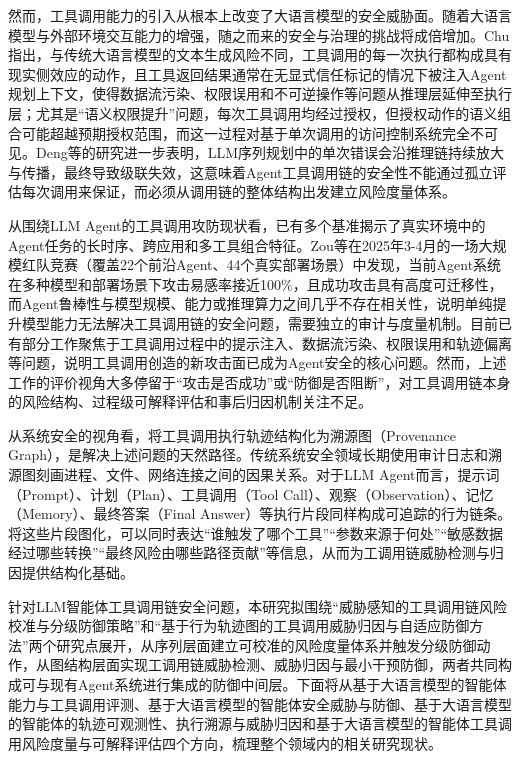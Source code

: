 然而，工具调用能力的引入从根本上改变了大语言模型的安全威胁面。随着大语言模型与外部环境交互能力的增强，随之而来的安全与治理的挑战将成倍增加\cite{weidinger2022taxonomy}。Chu\cite{chu2026systematic}指出，与传统大语言模型的文本生成风险不同，工具调用的每一次执行都构成具有现实侧效应的动作，且工具返回结果通常在无显式信任标记的情况下被注入Agent规划上下文，使得数据流污染、权限误用和不可逆操作等问题从推理层延伸至执行层；尤其是“语义权限提升”问题，每次工具调用均经过授权，但授权动作的语义组合可能超越预期授权范围，而这一过程对基于单次调用的访问控制系统完全不可见。Deng等\cite{deng2025agentsunderthreat}的研究进一步表明，LLM序列规划中的单次错误会沿推理链持续放大与传播，最终导致级联失效，这意味着Agent工具调用链的安全性不能通过孤立评估每次调用来保证，而必须从调用链的整体结构出发建立风险度量体系。

从围绕LLM Agent的工具调用攻防现状看，已有多个基准揭示了真实环境中的Agent任务的长时序、跨应用和多工具组合特征\cite{zhou2023webarena,deng2023mind2web,xie2024osworld,bonatti2025windows}。Zou等\cite{zou2025security}在2025年3-4月的一场大规模红队竞赛（覆盖22个前沿Agent、44个真实部署场景）中发现，当前Agent系统在多种模型和部署场景下攻击易感率接近100\%，且成功攻击具有高度可迁移性，而Agent鲁棒性与模型规模、能力或推理算力之间几乎不存在相关性，说明单纯提升模型能力无法解决工具调用链的安全问题，需要独立的审计与度量机制。目前已有部分工作\cite{balunovic2024agentdojo,chen2025struq,li2025drift,wu2025isolategpt,an2025ipiguard,li2025piguard,zhan2025adaptive,hung2025attention,debenedetti2025camel,costa2025fides}聚焦于工具调用过程中的提示注入、数据流污染、权限误用和轨迹偏离等问题，说明工具调用创造的新攻击面已成为Agent安全的核心问题。然而，上述工作的评价视角大多停留于“攻击是否成功”或“防御是否阻断”，对工具调用链本身的风险结构、过程级可解释评估和事后归因机制关注不足。

从系统安全的视角看，将工具调用执行轨迹结构化为溯源图（Provenance Graph），是解决上述问题的天然路径。传统系统安全领域长期使用审计日志和溯源图刻画进程、文件、网络连接之间的因果关系\cite{gao2021threatraptor,cheng2024kairos,inam2023sok}。对于LLM Agent而言，提示词（Prompt）、计划（Plan）、工具调用（Tool Call）、观察（Observation）、记忆（Memory）、最终答案（Final Answer）等执行片段同样构成可追踪的行为链条。将这些片段图化，可以同时表达“谁触发了哪个工具”“参数来源于何处”“敏感数据经过哪些转换”“最终风险由哪些路径贡献”等信息，从而为工调用链威胁检测与归因提供结构化基础\cite{wang2026agenttraces,dewitt2026openchallenges}。

针对LLM智能体工具调用链安全问题，本研究拟围绕“威胁感知的工具调用链风险校准与分级防御策略”和“基于行为轨迹图的工具调用威胁归因与自适应防御方法”两个研究点展开，从序列层面建立可校准的风险度量体系并触发分级防御动作，从图结构层面实现工调用链威胁检测、威胁归因与最小干预防御，两者共同构成可与现有Agent系统进行集成的防御中间层。下面将从基于大语言模型的智能体能力与工具调用评测、基于大语言模型的智能体安全威胁与防御、基于大语言模型的智能体的轨迹可观测性、执行溯源与威胁归因和基于大语言模型的智能体工具调用风险度量与可解释评估四个方向，梳理整个领域内的相关研究现状。

